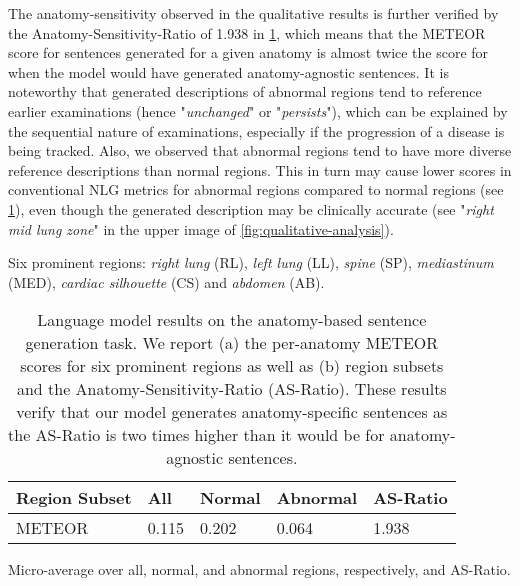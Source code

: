 \documentclass[10pt,twocolumn,letterpaper]{article}
\begin{document}
The anatomy-sensitivity observed in the qualitative results is further verified by the Anatomy-Sensitivity-Ratio of 1.938 in \cref{tab:meteor-region-results}, which means that the METEOR score for sentences generated for a given anatomy is almost twice the score for when the model would have generated anatomy-agnostic sentences. It is noteworthy that generated descriptions of abnormal regions tend to reference earlier examinations (hence "\emph{unchanged}" or "\emph{persists}"), which can be explained by the sequential nature of examinations, especially if the progression of a disease is being tracked. Also, we observed that abnormal regions tend to have more diverse reference descriptions than normal regions. This in turn may cause lower scores in conventional NLG metrics for abnormal regions compared to normal regions (see \cref{tab:meteor-region-results}), even though the generated description may be clinically accurate (see "\emph{right mid lung zone}" in the upper image of \cref{fig:qualitative-analysis}).

\begin{table}[t!]
\begin{subtable}{1\linewidth}
\centering
{}
\caption{Six prominent regions: \emph{right lung} (RL), \emph{left lung} (LL), \emph{spine} (SP), \emph{mediastinum} (MED), \emph{cardiac silhouette} (CS) and \emph{abdomen} (AB).}
\label{tab:meteor-region}
\end{subtable}

\vspace{1em}

\begin{subtable}{1\linewidth}
\small
\centering
\begin{tabular}{llll||l} \hline
Region Subset & All & Normal & Abnormal & AS-Ratio \\ \hline
METEOR                 & 0.115   & 0.202 & 0.064 & 1.938 \\ \hline                  
\end{tabular}
\caption{Micro-average over all, normal, and abnormal regions, respectively, and AS-Ratio.}
\label{tab:meteor-region-subset}
\end{subtable}
\caption{Language model results on the anatomy-based sentence generation task. We report (a) the per-anatomy METEOR scores for six prominent regions as well as (b) region subsets and the Anatomy-Sensitivity-Ratio (AS-Ratio). These results verify that our model generates anatomy-specific sentences as the AS-Ratio is two times higher than it would be for anatomy-agnostic sentences.}
\label{tab:meteor-region-results}
\end{table}
\end{document}
